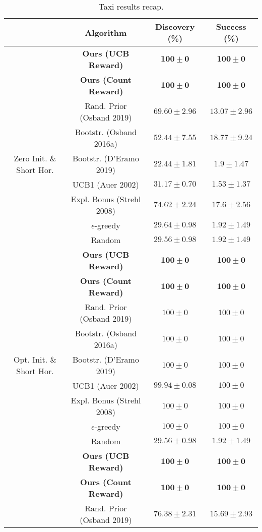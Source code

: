 \documentclass{article}
\begin{document}
\begin{table}[h]
	\centering
	\caption{Taxi results recap.}
	\begin{tabular}{ c | c | c c }
		& Algorithm & Discovery (\%) & Success (\%) \\
		\hline
		& \textbf{Ours (UCB Reward)} & $\mathbf{100 \pm 0}$ & $\mathbf{100 \pm 0}$ \\
		& \textbf{Ours (Count Reward)} & $\mathbf{100 \pm 0}$ & $\mathbf{100 \pm 0}$ \\
		& Rand. Prior (Osband 2019) & $69.60 \pm 2.96$ & $13.07 \pm 2.96$ \\
		& Bootstr. (Osband 2016a) & $52.44 \pm 7.55$ & $18.77 \pm 9.24$ \\
		Zero Init. \& Short Hor. & Bootstr. (D'Eramo 2019) & $22.44 \pm 1.81$ & $1.9 \pm 1.47$ \\
		& UCB1 (Auer 2002) & $31.17 \pm 0.70$ & $1.53 \pm 1.37$ \\
		& Expl. Bonus (Strehl 2008) & $74.62 \pm 2.24$ & $17.6 \pm 2.56$ \\
		& $\epsilon$-greedy & $29.64 \pm 0.98$ & $1.92 \pm 1.49$ \\
		& Random & $29.56 \pm 0.98$ & $1.92 \pm 1.49$ \\
		\hline
		& \textbf{Ours (UCB Reward)} & $\mathbf{100 \pm 0}$ & $\mathbf{100 \pm 0}$ \\
		& \textbf{Ours (Count Reward)} & $\mathbf{100 \pm 0}$ & $\mathbf{100 \pm 0}$ \\
		& Rand. Prior (Osband 2019) & $100 \pm 0$ & $100 \pm 0$ \\
		& Bootstr. (Osband 2016a) & $100 \pm 0$ & $100 \pm 0$ \\
		Opt. Init. \& Short Hor. & Bootstr. (D'Eramo 2019) & $100 \pm 0$ & $100 \pm 0$ \\
		& UCB1 (Auer 2002) & $99.94 \pm 0.08$ & $100 \pm 0$ \\
		& Expl. Bonus (Strehl 2008) & $100 \pm 0$ & $100 \pm 0$ \\
		& $\epsilon$-greedy & $100 \pm 0$ & $100 \pm 0$ \\
		& Random & $29.56 \pm 0.98$ & $1.92 \pm 1.49$ \\
		\hline
		& \textbf{Ours (UCB Reward)} & $\mathbf{100 \pm 0}$ & $\mathbf{100 \pm 0}$ \\
		& \textbf{Ours (Count Reward)} & $\mathbf{100 \pm 0}$ & $\mathbf{100 \pm 0}$ \\
		& Rand. Prior (Osband 2019) & $76.38 \pm 2.31$ & $15.69 \pm 2.93$ \\

\end{tabular}
\end{table}
\end{document}
